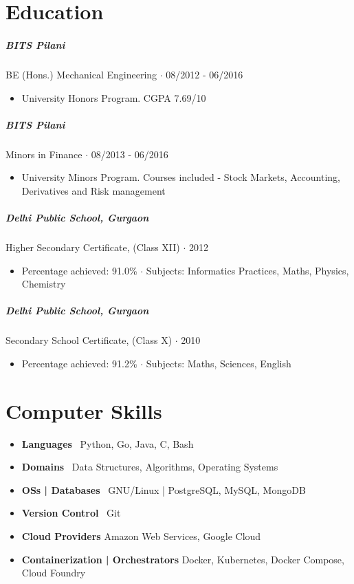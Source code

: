 \documentclass[10pt,letterpaper]{article}
\begin{document}
\section*{Education}

\subparagraph{BITS Pilani}
 BE (Hons.) Mechanical Engineering $\cdot$ 08/2012 - 06/2016
\begin{itemize}
    \item University Honors Program.  CGPA 7.69/10
\end{itemize}

\subparagraph{BITS Pilani}
Minors in Finance $\cdot$ 08/2013 - 06/2016
\begin{itemize}
    \item University Minors Program. Courses included - Stock Markets, Accounting, Derivatives and Risk management
\end{itemize}

\subparagraph{Delhi Public School, Gurgaon}
Higher Secondary Certificate, (Class XII) $\cdot$ 2012
\begin{itemize}
    \item Percentage achieved: 91.0\% $\cdot$ Subjects: Informatics Practices, Maths, Physics, Chemistry
\end{itemize}

\subparagraph{Delhi Public School, Gurgaon}
Secondary School Certificate, (Class X) $\cdot$ 2010
\begin{itemize}
    \item Percentage achieved: 91.2\% $\cdot$ Subjects: Maths, Sciences, English
\end{itemize}

\section*{Computer Skills}

\begin{itemize}
    \item \textbf{Languages} \ Python, Go, Java, C, Bash
    \item \textbf{Domains} \ Data Structures, Algorithms, Operating Systems
    \item \textbf{OSs | Databases} \ GNU/Linux | PostgreSQL, MySQL, MongoDB
    \item \textbf{Version Control} \ Git
    \item \textbf{Cloud Providers} Amazon Web Services, Google Cloud
    \item \textbf{Containerization | Orchestrators} Docker, Kubernetes, Docker Compose, Cloud Foundry
\end{itemize}
\end{document}
